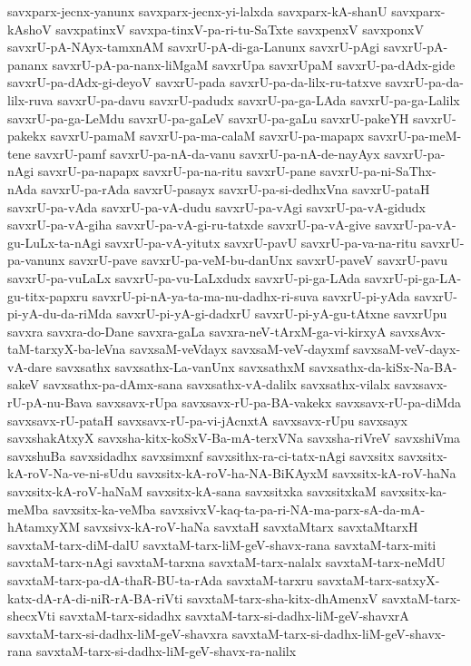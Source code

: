 {savxparx-jecnx-yanunx
savxparx-jecnx-yi-lalxda
savxparx-kA-shanU
savxparx-kAshoV
savxpatinxV
savxpa-tinxV-pa-ri-tu-SaTxte
savxpenxV
savxponxV
savxrU-pA-NAyx-tamxnAM
savxrU-pA-di-ga-Lanunx
savxrU-pAgi
savxrU-pA-pananx
savxrU-pA-pa-nanx-liMgaM
savxrUpa
savxrUpaM
savxrU-pa-dAdx-gide
savxrU-pa-dAdx-gi-deyoV
savxrU-pada
savxrU-pa-da-lilx-ru-tatxve
savxrU-pa-da-lilx-ruva
savxrU-pa-davu
savxrU-padudx
savxrU-pa-ga-LAda
savxrU-pa-ga-Lalilx
savxrU-pa-ga-LeMdu
savxrU-pa-gaLeV
savxrU-pa-gaLu
savxrU-pakeYH
savxrU-pakekx
savxrU-pamaM
savxrU-pa-ma-calaM
savxrU-pa-mapapx
savxrU-pa-meM-tene
savxrU-pamf
savxrU-pa-nA-da-vanu
savxrU-pa-nA-de-nayAyx
savxrU-pa-nAgi
savxrU-pa-napapx
savxrU-pa-na-ritu
savxrU-pane
savxrU-pa-ni-SaThx-nAda
savxrU-pa-rAda
savxrU-pasayx
savxrU-pa-si-dedhxVna
savxrU-pataH
savxrU-pa-vAda
savxrU-pa-vA-dudu
savxrU-pa-vAgi
savxrU-pa-vA-gidudx
savxrU-pa-vA-giha
savxrU-pa-vA-gi-ru-tatxde
savxrU-pa-vA-give
savxrU-pa-vA-gu-LuLx-ta-nAgi
savxrU-pa-vA-yitutx
savxrU-pavU
savxrU-pa-va-na-ritu
savxrU-pa-vanunx
savxrU-pave
savxrU-pa-veM-bu-danUnx
savxrU-paveV
savxrU-pavu
savxrU-pa-vuLaLx
savxrU-pa-vu-LaLxdudx
savxrU-pi-ga-LAda
savxrU-pi-ga-LA-gu-titx-papxru
savxrU-pi-nA-ya-ta-ma-nu-dadhx-ri-suva
savxrU-pi-yAda
savxrU-pi-yA-du-da-riMda
savxrU-pi-yA-gi-dadxrU
savxrU-pi-yA-gu-tAtxne
savxrUpu
savxra
savxra-do-Dane
savxra-gaLa
savxra-neV-tArxM-ga-vi-kirxyA
savxsAvx-taM-tarxyX-ba-leVna
savxsaM-veVdayx
savxsaM-veV-dayxmf
savxsaM-veV-dayx-vA-dare
savxsathx
savxsathx-La-vanUnx
savxsathxM
savxsathx-da-kiSx-Na-BA-sakeV
savxsathx-pa-dAmx-sana
savxsathx-vA-dalilx
savxsathx-vilalx
savxsavx-rU-pA-nu-Bava
savxsavx-rUpa
savxsavx-rU-pa-BA-vakekx
savxsavx-rU-pa-diMda
savxsavx-rU-pataH
savxsavx-rU-pa-vi-jAcnxtA
savxsavx-rUpu
savxsayx
savxshakAtxyX
savxsha-kitx-koSxV-Ba-mA-terxVNa
savxsha-riVreV
savxshiVma
savxshuBa
savxsidadhx
savxsimxnf
savxsithx-ra-ci-tatx-nAgi
savxsitx
savxsitx-kA-roV-Na-ve-ni-sUdu
savxsitx-kA-roV-ha-NA-BiKAyxM
savxsitx-kA-roV-haNa
savxsitx-kA-roV-haNaM
savxsitx-kA-sana
savxsitxka
savxsitxkaM
savxsitx-ka-meMba
savxsitx-ka-veMba
savxsivxV-kaq-ta-pa-ri-NA-ma-parx-sA-da-mA-hAtamxyXM
savxsivx-kA-roV-haNa
savxtaH
savxtaMtarx
savxtaMtarxH
savxtaM-tarx-diM-dalU
savxtaM-tarx-liM-geV-shavx-rana
savxtaM-tarx-miti
savxtaM-tarx-nAgi
savxtaM-tarxna
savxtaM-tarx-nalalx
savxtaM-tarx-neMdU
savxtaM-tarx-pa-dA-thaR-BU-ta-rAda
savxtaM-tarxru
savxtaM-tarx-satxyX-katx-dA-rA-di-niR-rA-BA-riVti
savxtaM-tarx-sha-kitx-dhAmenxV
savxtaM-tarx-shecxVti
savxtaM-tarx-sidadhx
savxtaM-tarx-si-dadhx-liM-geV-shavxrA
savxtaM-tarx-si-dadhx-liM-geV-shavxra
savxtaM-tarx-si-dadhx-liM-geV-shavx-rana
savxtaM-tarx-si-dadhx-liM-geV-shavx-ra-nalilx
}
